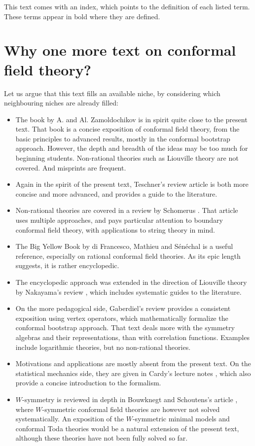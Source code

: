 \documentclass[12pt, a4paper, notitlepage, twoside]{report}
\numberwithin{equation}{section}
\theoremstyle{break}
\begin{document}
This text comes with an index, which points to the definition of each listed term. 
These terms appear in bold where they are defined.


\section{Why one more text on conformal field theory?}\label{sec:womt}

Let us argue that this text fills an available niche, by considering which neighbouring niches are already filled: 
\begin{itemize}
\item 
The book \cite{zz90} by A. and Al. Zamoldochikov is in spirit quite close to the present text.
That book is a concise exposition of conformal field theory, from the basic principles to advanced results, mostly in the conformal bootstrap approach.
However, the depth and breadth of the ideas may be too much for beginning students.
Non-rational theories such as Liouville theory are not covered.
And misprints are frequent.
\item
Again in the spirit of the present text, Teschner's review article \cite{tes17} is both more concise and more advanced, and provides a guide to the literature.
\item
Non-rational theories are covered in a review by Schomerus \cite{sch05}.
That article uses multiple approaches, and pays particular attention to boundary conformal field theory, with applications to string theory in mind. 
\item
The Big Yellow Book \cite{fms97} by di Francesco, Mathieu and Sénéchal is a useful reference, especially on rational conformal field theories.
As its epic length suggests, it is rather encyclopedic. 
\item
The encyclopedic approach was extended in the direction of Liouville theory by Nakayama's review \cite{nak04}, which includes systematic guides to the literature.
\item 
On the more pedagogical side, Gaberdiel's review \cite{gab99} provides a consistent exposition using vertex operators, which mathematically formalize the conformal bootstrap approach.
That text deals more with the symmetry algebras and their representations, than with correlation functions.
Examples include logarithmic theories, but no non-rational theories.
\item
Motivations and applications are mostly absent from the present text.
On the statistical mechanics side, they are given in Cardy's lecture notes \cite{car08}, which also provide a concise introduction to the formalism.
\item 
$W$-symmetry is reviewed in depth in Bouwknegt and Schoutens's article \cite{bs92}, where $W$-symmetric conformal field theories are however not solved systematically.
An exposition of the $W$-symmetric minimal models and conformal Toda theories would be a natural extension of the present text, although these theories have not been fully solved so far. 
\end{itemize}
\end{document}
